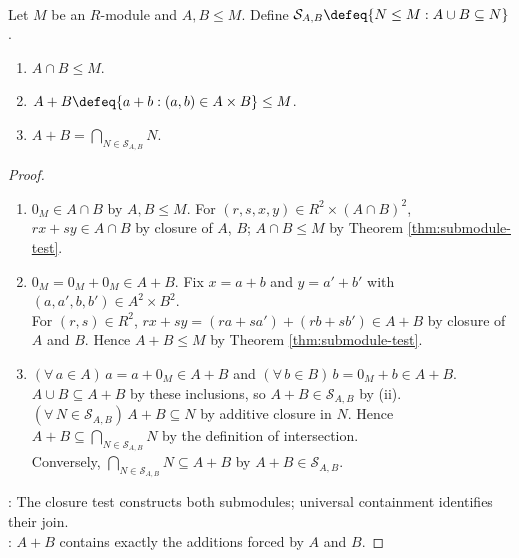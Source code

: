 \begin{proposition} \label{prop:submodule-intersection-sum} \\
Let $M$ be an $R$-module and $A,B\leq M$. Define $\mathcal{S}_{A,B}\defeq\{N\leq M:A\cup B\subseteq N\}$.
\begin{enumerate}[label=(\roman*)]
\setlength{\itemsep}{0pt}
\item $A\cap B\leq M$.
\item $A+B\defeq\{a+b:(a,b)\in A\times B\}\leq M$.
\item $A+B=\bigcap\limits_{N\in\mathcal{S}_{A,B}}N$.
\end{enumerate}
\begin{proof}
\begin{enumerate}[label=(\roman*)]
\setlength{\itemsep}{0pt}
\item $0_M\in A\cap B$ by $A,B\leq M$. For $(r,s,x,y)\in R^2\times(A\cap B)^2$, $rx+sy\in A\cap B$ by closure of $A$, $B$; $A\cap B\leq M$ by Theorem \ref{thm:submodule-test}.
\item $0_M=0_M+0_M\in A+B$. Fix $x=a+b$ and $y=a'+b'$ with $(a,a',b,b')\in A^2\times B^2$.\\
For $(r,s)\in R^2$, $rx+sy=(ra+sa')+(rb+sb')\in A+B$ by closure of $A$ and $B$. Hence $A+B\leq M$ by Theorem \ref{thm:submodule-test}.
\item $(\forall\,a\in A)\,a=a+0_M\in A+B$ and $(\forall\,b\in B)\,b=0_M+b\in A+B$. $A\cup B\subseteq A+B$ by these inclusions, so $A+B\in\mathcal{S}_{A,B}$ by (ii).\\
$(\forall\,N\in\mathcal{S}_{A,B})\,A+B\subseteq N$ by additive closure in $N$. Hence $A+B\subseteq\bigcap\limits_{N\in\mathcal{S}_{A,B}}N$ by the definition of intersection.\\
Conversely, $\bigcap\limits_{N\in\mathcal{S}_{A,B}}N\subseteq A+B$ by $A+B\in\mathcal{S}_{A,B}$.
\end{enumerate}
: The closure test constructs both submodules; universal containment identifies their join.\\
: $A+B$ contains exactly the additions forced by $A$ and $B$.
\end{proof}
\end{proposition}

